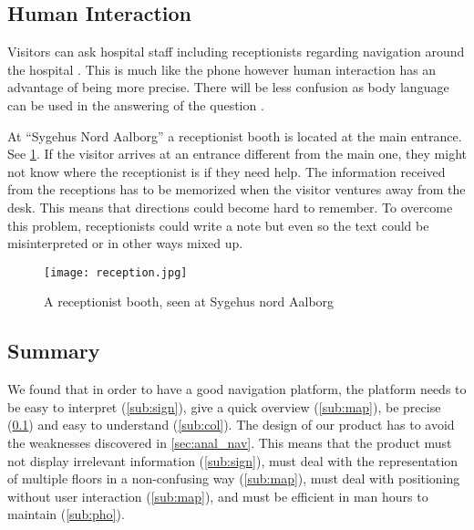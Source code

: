 \subsection{Human Interaction}\label{sub:human}
Visitors can ask hospital staff including receptionists regarding navigation around the hospital \cite{job}. This is much like the phone however human interaction has an advantage of being more precise. There will be less confusion as body language can be used in the answering of the question \cite{body_vs_phone}.

At \enquote{Sygehus Nord Aalborg} a receptionist booth is located at the main entrance. See \cref{fig:rec_booth}. If the visitor arrives at an entrance different from the main one, they might not know where the receptionist is if they need help. The information received from the receptions has to be memorized when the visitor ventures away from the desk. This means that directions could become hard to remember. To overcome this problem, receptionists could write a note but even so the text could be misinterpreted or in other ways mixed up.

  \begin{figure}[ht!]
    \centering
    \texttt{[image: reception.jpg]}
    \caption{A receptionist booth, seen at Sygehus nord Aalborg}
    \label{fig:rec_booth}
  \end{figure}

\subsection{Summary} %
  We found that in order to have a good navigation platform, the platform needs to be easy to interpret (\cref{sub:sign}), give a quick overview (\cref{sub:map}), be precise (\cref{sub:human}) and easy to understand (\cref{sub:col}). The design of our product has to avoid the weaknesses discovered in \cref{sec:anal_nav}. This means that the product must not display irrelevant information (\cref{sub:sign}), must deal with the representation of multiple floors in a non-confusing way (\cref{sub:map}), must deal with positioning without user interaction (\cref{sub:map}), and must be efficient in man hours to maintain (\cref{sub:pho}).